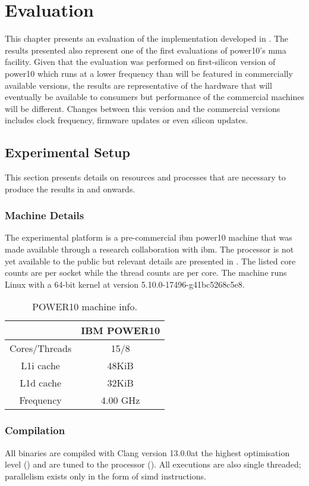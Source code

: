 \documentclass[\main/thesis.tex]{subfiles}
\begin{document}
\chapter{Evaluation}
\label{cha:evaluation}
This chapter presents an evaluation of the implementation developed in .
The results presented also represent one of the first evaluations of \gls{power10}'s \gls{mma} facility.
Given that the evaluation was performed on first-silicon version of \gls{power10} which runs at a lower frequency than will be featured in commercially available versions, the results are representative of the hardware that will eventually be available to consumers but performance of the commercial machines will be different.
Changes between this version and the commercial versions includes clock frequency, firmware updates or even silicon updates.

\section{Experimental Setup}
This section presents details on resources and processes that are necessary to produce the results in  and onwards.

\subsection{Machine Details}
The experimental platform is a pre-commercial \gls{ibm} \gls{power10} machine that was made available through a research collaboration with \gls{ibm}.
The processor is not yet available to the public but relevant details are presented in .
The listed core counts are per socket while the thread counts are per core.
The machine runs Linux with a 64-bit kernel at version 5.10.0-17496-g41bc5268c5e8.

\begin{table}[t]
  \centering
  \begin{tabular}{c | c}
    & IBM POWER10\\\hline
    Cores/Threads & 15/8\\
    L1i cache & 48KiB\\
    L1d cache & 32KiB\\
    Frequency & 4.00 GHz\\
  \end{tabular}
  \caption{POWER10 machine info.}
  \label{tab:machineInfo}
\end{table}

\subsection{Compilation}
All binaries are compiled with Clang version 13.0.0\footnotemark at the highest optimisation level () and are tuned to the processor ().
All executions are also single threaded; parallelism exists only in the form of \gls{simd} instructions.
\end{document}
